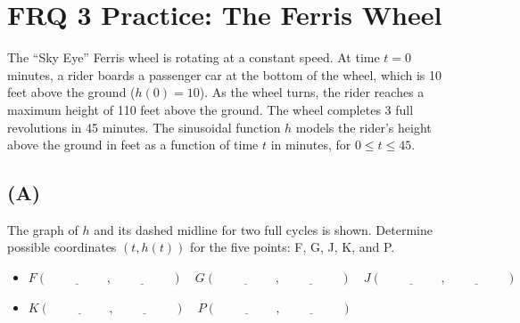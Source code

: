 \documentclass[12pt]{article}
\begin{document}
\section*{FRQ 3 Practice: The Ferris Wheel}
The ``Sky Eye'' Ferris wheel is rotating at a constant speed. At time $t=0$ minutes, a rider boards a passenger car at the bottom of the wheel, which is 10 feet above the ground ($h(0)=10$). As the wheel turns, the rider reaches a maximum height of 110 feet above the ground. The wheel completes 3 full revolutions in 45 minutes. The sinusoidal function $h$ models the rider's height above the ground in feet as a function of time $t$ in minutes, for $0 \le t \le 45$.

\subsection*{(A)}
The graph of $h$ and its dashed midline for two full cycles is shown. Determine possible coordinates $(t, h(t))$ for the five points: F, G, J, K, and P.

\begin{center}
\end{center}

\begin{itemize}[label={}]
    \item $F(\underline{\hspace{2cm}}, \underline{\hspace{2cm}}) \quad G(\underline{\hspace{2cm}}, \underline{\hspace{2cm}}) \quad J(\underline{\hspace{2cm}}, \underline{\hspace{2cm}})$
    \item $K(\underline{\hspace{2cm}}, \underline{\hspace{2cm}}) \quad P(\underline{\hspace{2cm}}, \underline{\hspace{2cm}})$
\end{itemize}
\end{document}
